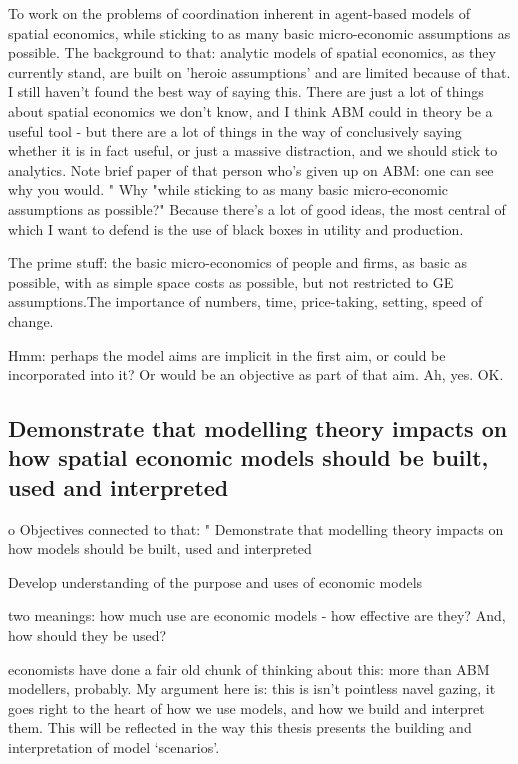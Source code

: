 To work on the problems of coordination inherent in agent-based models of spatial economics, while sticking to as many basic micro-economic assumptions as possible.
The background to that: analytic models of spatial economics, as they currently stand, are built on 'heroic assumptions' and are limited because of that. I still haven't found the best way of saying this. There are just a lot of things about spatial economics we don't know, and I think ABM could in theory be a useful tool - but there are a lot of things in the way of conclusively saying whether it is in fact useful, or just a massive distraction, and we should stick to analytics. Note brief paper of that person who's given up on ABM: one can see why you would.
"	Why "while sticking to as many basic micro-economic assumptions as possible?" Because there's a lot of good ideas, the most central of which I want to defend is the use of black boxes in utility and production.

The prime stuff: the basic micro-economics of people and firms, as basic as possible, with as simple space costs as possible, but not restricted to GE assumptions.The importance of numbers, time, price-taking, setting, speed of change. 

Hmm: perhaps the model aims are implicit in the first aim, or could be incorporated into it? Or would be an objective as part of that aim. Ah, yes. OK. 

\subsection{Demonstrate that modelling theory impacts on how spatial economic models should be built, used and interpreted \label{sec:aim2}}

o	Objectives connected to that:
"	Demonstrate that modelling theory impacts on how models should be built, used and interpreted

Develop understanding of the purpose and uses of economic models

two meanings: how much use are economic models - how effective are they? And, how should they be used?

economists have done a fair old chunk of thinking about this: more than ABM modellers, probably. My argument here is: this is isn't pointless navel gazing, it goes right to the heart of how we use models, and how we build and interpret them. This will be reflected in the way this thesis presents the building and interpretation of model `scenarios'.
 
